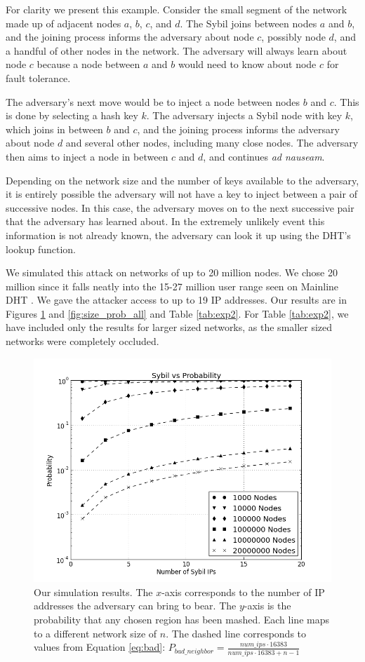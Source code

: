 For clarity we present this example. 
Consider the small segment of the network made up of adjacent nodes $a$, $b$, $c$, and $d$.
The Sybil joins between nodes $a$ and $b$, and the joining process informs the adversary about node $c$, possibly node $d$, and a handful of other nodes in the network.
The adversary will always learn about node $c$ because a node between $a$ and $b$ would need to know about node $c$ for fault tolerance.

The adversary's next move would be to inject a node between nodes $b$ and $c$.
This is done by selecting a hash key $k$.
The adversary injects a Sybil node with key $k$, which joins in between $b$ and $c$, and the joining process informs the adversary about node $d$ and several other nodes, including many close nodes.
The adversary then aims to inject a node in between $c$ and $d$, and continues \textit{ad nauseam}.  %

Depending on the network size and the number of keys available to the adversary, it is entirely possible the adversary will not have a key to inject between a pair of successive nodes.
In this case, the adversary moves on to the next successive pair that the adversary has learned about.
In the extremely unlikely event this information is not already known, the adversary can look it up using the DHT's lookup function.

We simulated this attack on networks of up to 20 million nodes.
We chose 20 million since it falls neatly into the 15-27 million user range seen on Mainline DHT \cite{mainlineMeasure}.
We gave the attacker access to up to 19 IP addresses.
Our results are in Figures \ref{fig:exp2} and \ref{fig:size_prob_all} and Table \ref{tab:exp2}.
For Table \ref{tab:exp2}, we have included only the results for larger sized networks, as the smaller sized networks were completely occluded.


\begin{figure}
	\centering
	\includegraphics[width=0.7\linewidth]{figs/ip_prob_all}
	\caption[Simulation results for mashing]{Our simulation results.  
		The $x$-axis corresponds to the number of IP addresses the adversary can bring to bear.
		The $y$-axis is the probability that any chosen region has been mashed.
		Each line maps to a different network size of $n$.
		The dashed line corresponds to values from Equation \ref{eq:bad}: $ P_{bad\_neighbor} =  \frac{num\_ips \cdot 16383}{num\_ips \cdot 16383 + n - 1}$}
	\label{fig:exp2}
\end{figure}



